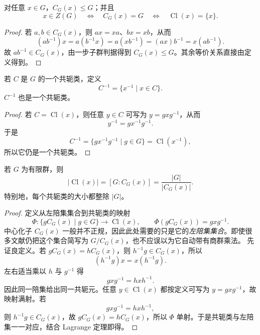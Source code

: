 \begin{proposition}[中心化子是子群]
对任意 $x\in G$，$C_G(x)\leqslant G$；并且
\[
x\in Z(G)
\quad\Longleftrightarrow\quad
C_G(x)=G
\quad\Longleftrightarrow\quad
\operatorname{Cl}(x)=\{x\}.
\]
\label{prop:centralizer-subgroup}

\end{proposition}

\begin{proof}
若 $a,b\in C_G(x)$，则 $ax=xa$、$bx=xb$，从而
\[
(ab^{-1})x=a(b^{-1}x)=a(xb^{-1})=(ax)b^{-1}=x(ab^{-1}).
\]
故 $ab^{-1}\in C_G(x)$，由一步子群判据得到 $C_G(x)\leqslant G$。其余等价关系直接由定义得到。
\end{proof}

\begin{proposition}[逆共轭类]
若 $C$ 是 $G$ 的一个共轭类，定义
\[
C^{-1}=\{x^{-1}\mid x\in C\}.
\]
 $C^{-1}$ 也是一个共轭类。
\end{proposition}

\begin{proof}
若 $C=\operatorname{Cl}(x)$，则任意 $y\in C$ 可写为 $y=gxg^{-1}$，从而
\[
y^{-1}=gx^{-1}g^{-1}.
\]
于是
\[
C^{-1}=\{gx^{-1}g^{-1}\mid g\in G\}=\operatorname{Cl}(x^{-1}),
\]
所以它仍是一个共轭类。
\end{proof}

\begin{theorem}[共轭类大小公式]
若 $G$ 为有限群，则
\[
\lvert\operatorname{Cl}(x)\rvert=[G:C_G(x)]
=\frac{\lvert G\rvert}{\lvert C_G(x)\rvert}.
\label{eq:class-size}
\]
特别地，每个共轭类的大小都整除 $\lvert G\rvert$。
\label{thm:class-size}

\end{theorem}

\begin{proof}
定义从左陪集集合到共轭类的映射
\[
\Phi:\{gC_G(x)\mid g\in G\}\longrightarrow \operatorname{Cl}(x),
\qquad
\Phi(gC_G(x))=gxg^{-1}.
\]
中心化子 $C_G(x)$ 一般并不正规，因此此处需要的只是它的\emph{左陪集集合}。即使很多文献仍把这个集合简写为 $G/C_G(x)$，也不应误以为它自动带有商群乘法。
先证良定义。若 $gC_G(x)=hC_G(x)$，则 $h^{-1}g\in C_G(x)$，所以
\[
(h^{-1}g)x=x(h^{-1}g).
\]
左右适当乘以 $h$ 与 $g^{-1}$ 得
\[
gxg^{-1}=hxh^{-1}.
\]
因此同一陪集给出同一共轭元。任意 $y\in\operatorname{Cl}(x)$ 都按定义可写为 $y=gxg^{-1}$，故映射满射。若
\[
gxg^{-1}=hxh^{-1},
\]
则 $h^{-1}g\in C_G(x)$，故 $gC_G(x)=hC_G(x)$，所以 $\Phi$ 单射。于是共轭类与左陪集一一对应，结合 Lagrange 定理即得。
\end{proof}

